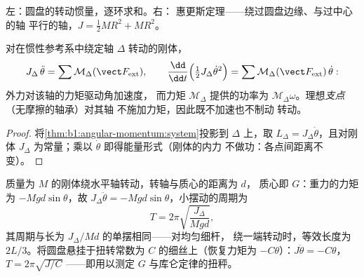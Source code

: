 \begin{omfigure}

{\small 左：圆盘的转动惯量，逐环求和。右：
惠更斯定理——绕过圆盘边缘、与过中心的轴
平行的轴，$J = \tfrac12 MR^2 + MR^2$。}
\end{omfigure}

\begin{theorem}[定轴刚体的动力学]\label{thm:b1:systems-of-points:rotation}
对在惯性参考系中绕定轴 $\Delta$ 转动的刚体，
\[
J_\Delta\,\ddot\theta = \sum\mathcal M_\Delta(\vect F_{\mathrm{ext}}),
\qquad
\frac{\dd}{\dd t}\Big(\tfrac12 J_\Delta\dot\theta^2\Big) = \sum\mathcal M_\Delta(\vect F_{\mathrm{ext}})\,\dot\theta :
\]
外力对该轴的力矩驱动角加速度，
而力矩 $\mathcal M_\Delta$ 提供的功率为
$\mathcal M_\Delta\omega$。理想\emph{支点}（无摩擦的轴承）对其轴
不施加力矩，因此既不加速也不制动
转动。
\end{theorem}

\begin{proof}
将\cref{thm:b1:angular-momentum:system}投影到 $\Delta$ 上，取 $L_\Delta
= J_\Delta\dot\theta$，且对刚体 $J_\Delta$ 为常量；乘以
$\dot\theta$ 即得能量形式（刚体的内力
不做功：各点间距离不变）。
\end{proof}

\begin{example}[复摆；扭摆]\label{ex:b1:systems-of-points:pendulums}
质量为 $M$ 的刚体绕水平轴转动，转轴与质心的距离为 $d$，
质心即 $G$：重力的力矩为 $-Mgd\sin\theta$，故 $J_\Delta\ddot\theta =
-Mgd\sin\theta$，小摆动的周期为
\[
T = 2\pi\sqrt{\frac{J_\Delta}{Mgd}} ,
\]
其周期与长为 $J_\Delta/Md$ 的单摆相同——对均匀细杆，
绕一端转动时，等效长度为 $2L/3$。将圆盘悬挂于扭转常数为
$C$ 的细丝上（恢复力矩为 $-C\theta$）：$J\ddot\theta = -C\theta$，$T = 2\pi\sqrt{J/C}$
——即用以测定 $G$ 与库仑定律的扭秤。
\end{example}

